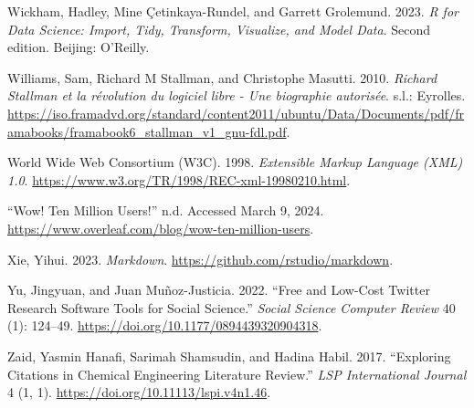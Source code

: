 \documentclass[
  letterpaper,
]{scrbook}
\newlength{\cslhangindent}
\newlength{\cslentryspacingunit} %
\newenvironment{CSLReferences}[2] %
 {%
  \setlength{\parindent}{0pt}
  \ifodd #1
  \let\oldpar\par
  \def\par{\hangindent=\cslhangindent\oldpar}
  \fi
  \setlength{\parskip}{#2\cslentryspacingunit}
 }%
 {}
\begin{document}
\begin{CSLReferences}{1}{0}
\leavevmode{}%
Wickham, Hadley, Mine Çetinkaya-Rundel, and Garrett Grolemund. 2023.
\emph{R for Data Science: Import, Tidy, Transform, Visualize, and Model
Data}. Second edition. Beijing: O'Reilly.

\leavevmode{}%
Williams, Sam, Richard M Stallman, and Christophe Masutti. 2010.
\emph{Richard Stallman et la révolution du logiciel libre - Une
biographie autorisée}. s.l.: Eyrolles.
\url{https://iso.framadvd.org/standard/content2011/ubuntu/Data/Documents/pdf/framabooks/framabook6_stallman_v1_gnu-fdl.pdf}.

\leavevmode{}%
World Wide Web Consortium (W3C). 1998. \emph{Extensible {Markup
Language} ({XML}) 1.0}.
\url{https://www.w3.org/TR/1998/REC-xml-19980210.html}.

\leavevmode{}%
{``Wow! {Ten} Million Users!''} n.d. Accessed March 9, 2024.
\url{https://www.overleaf.com/blog/wow-ten-million-users}.

\leavevmode{}%
Xie, Yihui. 2023. \emph{Markdown}.
\url{https://github.com/rstudio/markdown}.

\leavevmode{}%
Yu, Jingyuan, and Juan Muñoz-Justicia. 2022. {``Free and {Low-Cost
Twitter Research Software Tools} for {Social Science}.''} \emph{Social
Science Computer Review} 40 (1): 124--49.
\url{https://doi.org/10.1177/0894439320904318}.

\leavevmode{}%
Zaid, Yasmin Hanafi, Sarimah Shamsudin, and Hadina Habil. 2017.
{``Exploring {Citations} in {Chemical Engineering Literature Review}.''}
\emph{LSP International Journal} 4 (1, 1).
\url{https://doi.org/10.11113/lspi.v4n1.46}.

\end{CSLReferences}


\backmatter
\end{document}
